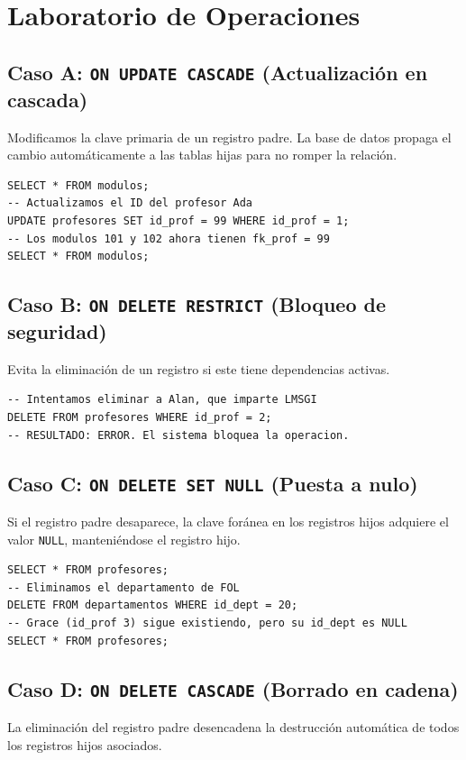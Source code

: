 \documentclass[12pt,a4paper]{article}
\begin{document}
\section{Laboratorio de Operaciones}

\subsection{Caso A: \texttt{ON UPDATE CASCADE} (Actualización en cascada)}
Modificamos la clave primaria de un registro padre. La base de datos propaga el cambio automáticamente a las tablas hijas para no romper la relación.

\begin{lstlisting}
SELECT * FROM modulos;
-- Actualizamos el ID del profesor Ada
UPDATE profesores SET id_prof = 99 WHERE id_prof = 1;
-- Los modulos 101 y 102 ahora tienen fk_prof = 99
SELECT * FROM modulos;
\end{lstlisting}

\subsection{Caso B: \texttt{ON DELETE RESTRICT} (Bloqueo de seguridad)}
Evita la eliminación de un registro si este tiene dependencias activas.

\begin{lstlisting}
-- Intentamos eliminar a Alan, que imparte LMSGI
DELETE FROM profesores WHERE id_prof = 2;
-- RESULTADO: ERROR. El sistema bloquea la operacion.
\end{lstlisting}

\subsection{Caso C: \texttt{ON DELETE SET NULL} (Puesta a nulo)}
Si el registro padre desaparece, la clave foránea en los registros hijos adquiere el valor \texttt{NULL}, manteniéndose el registro hijo.

\begin{lstlisting}
SELECT * FROM profesores;
-- Eliminamos el departamento de FOL
DELETE FROM departamentos WHERE id_dept = 20;
-- Grace (id_prof 3) sigue existiendo, pero su id_dept es NULL
SELECT * FROM profesores;
\end{lstlisting}

\subsection{Caso D: \texttt{ON DELETE CASCADE} (Borrado en cadena)}
La eliminación del registro padre desencadena la destrucción automática de todos los registros hijos asociados.
\end{document}
